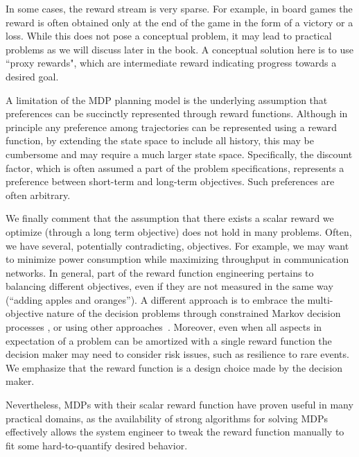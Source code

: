 In some cases, the reward stream is very sparse. For example, in board games the reward is often obtained only at the end of the game in the form of a victory or a loss. While this does not pose a conceptual problem, it may lead to practical problems as we will discuss later in the book. A conceptual solution here is to use ``proxy rewards", which are intermediate reward indicating progress towards a desired goal. 

A limitation of the MDP planning model is
the underlying assumption that preferences can be succinctly represented through reward functions. Although in principle any preference among trajectories can be
represented using a reward function, by extending the state space to include all history, this may be cumbersome and may require a much larger state space. Specifically, the discount factor, which is often assumed a part of the problem specifications, represents a preference between short-term and long-term objectives. Such preferences are often arbitrary.

We finally comment that the assumption that there exists a scalar reward we optimize (through a long term objective) does not hold in many problems. Often, we have several, potentially contradicting, objectives. For example, we may want to minimize power consumption while maximizing throughput in communication networks. In general, part of the reward function engineering pertains to balancing different objectives, even if they are not measured in the same way (``adding apples and oranges''). A different approach is to embrace the multi-objective nature of the decision problems through constrained Markov decision processes \cite{altman2021constrained}, or using other approaches~\cite[e.g.,][]{mannor2004geometric}.
Moreover, even when all aspects in expectation of a problem can be amortized with a single reward function the decision maker may need to consider risk issues, such as resilience to rare events. 
We emphasize that the reward function is a design choice made by the decision maker.



Nevertheless, MDPs with their scalar reward function have proven useful in many practical domains, as the availability of strong algorithms for solving MDPs effectively allows the system engineer to tweak the reward function manually to fit some hard-to-quantify desired behavior.

